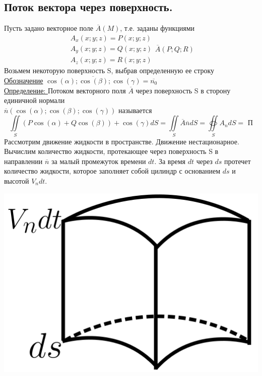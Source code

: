\documentclass[12pt]{article}
\let\ORIincludegraphics\includegraphics
\renewcommand{\includegraphics}[2][]{\ORIincludegraphics[scale=0.65,#1]{#2}}
\let\oldiint\iint
\let\oldoiint\oiint
\renewcommand{\iint}{\oldiint\limits}
\renewcommand{\oiint}{\oldoiint\limits}
\begin{document}
  \subsection{Поток вектора через поверхность.}
  Пусть задано векторное поле $\overline{A}(M)$, т.е. заданы функциями
  \[\begin{matrix}
    A_x(x;y;z)=P(x;y;z)\\
    A_y(x;y;z)=Q(x;y;z)\\
    A_z(x;y;z)=R(x;y;z)
  \end{matrix} \overline{A}(P;Q;R)\]
  Возьмем некоторую поверхность S, выбрав определенную ее строку\\
  \underline{Обозначение} $\overline{\cos(\alpha);\cos(\beta);\cos(\gamma)}=\overline{n_0}$\\
  \underline{Определение: } Потоком векторного поля $\overline{A}$ через поверхность S в сторону единичной нормали\\
  $\overline{n}(\cos(\alpha);\cos(\beta);\cos(\gamma))$ называется 
  \[\iint_S (P\cos(\alpha)+Q\cos(\beta))+\cos(\gamma)dS=\iint_S \overline{A} \overline{n}dS = \oiint_S A_n dS=\text{ П}\]
  Рассмотрим движение жидкости в пространстве. Движение нестационарное. Вычислим количество жидкости, протекающее
  через поверхность S в направлении $\overline{n}$ за малый промежуток времени $dt$. За время $dt$ через $ds$ протечет
  количество жидкости, которое заполняет собой цилиндр с основанием $ds$ и высотой $V_n dt$.\\
  \begin{minipage}{0.45\textwidth}
    \includegraphics[scale=0.6]{9.2.png}
  \end{minipage}
  \hspace{1em}
\end{document}
